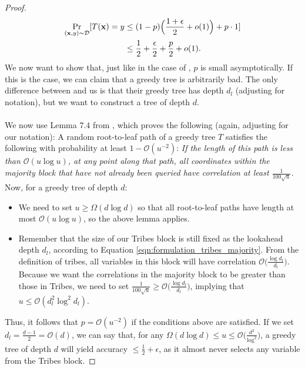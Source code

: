 \begin{proof}
\begin{align}
    \Pr_{(\mathbf{x},y)\sim \mathcal{D}}[T(\mathbf{x}) = y &\leq (1-p)\Big(\frac{1 + \epsilon}{2} + o(1)\Big) + p\cdot 1]\\
    &\leq \frac{1}{2} + \frac{\epsilon}{2} + \frac{p}{2} + o(1).
\end{align}
We now want to show that, just like in the case of \cite{topk}, $p$ is small asymptotically. If this is the case, we can claim that a greedy tree is arbitrarily bad. The only difference between \cite{topk} and us is that their greedy tree has depth $d_l$ (adjusting for notation), but we want to construct a tree of depth $d$. \\
\\
We now use Lemma $7.4$ from \cite{blanc2019top}, which proves the following (again, adjusting for our notation): 
A random root-to-leaf path of a greedy tree $T$ satisfies the following with probability at least $1-\mathcal{O}(u^{-2})$: \textit{If the length of this path is less than $\mathcal{O}(u \log u)$, at any point along that path, all coordinates within the majority block that have not already been queried have correlation at least $\frac{1}{100\sqrt{u}}$.}
Now, for a greedy tree of depth $d$: 
\begin{itemize}
    \item We need to set $u \geq \Omega(d\log d)$ so that all root-to-leaf paths have length at most $\mathcal{O}(u \log u)$, so the above lemma applies. 
    \item Remember that the size of our Tribes block is still fixed as the lookahead depth $d_l$, according to Equation \ref{eqn:formulation_tribes_majority}. From the definition of tribes, all variables in this block will have correlation $\mathcal{O}\Big(\frac{\log d_l}{d_l}\Big)$. Because we want the correlations in the majority block to be greater than those in Tribes, we need to set $\frac{1}{100\sqrt{u}} \geq \mathcal{O}\Big(\frac{\log d_l}{d_l}\Big)$, implying that $u \leq \mathcal{O}(d_l^2\log^2d_l)$. 
\end{itemize}
Thus, it follows that $p = \mathcal{O}(u^{-2})$ if the conditions above are satisfied. If we set $d_l =\frac{d-1}{2} =\mathcal{O}(d)$, we can say that, for any $\Omega(d\log d) \leq u \leq \mathcal{O}\Big(\frac{d^2}{\log^2}\Big)$, a greedy tree of depth $d$ will yield accuracy $\leq \frac{1}{2} + \epsilon$, as it almost never selects any variable from the Tribes block.
\end{proof}

